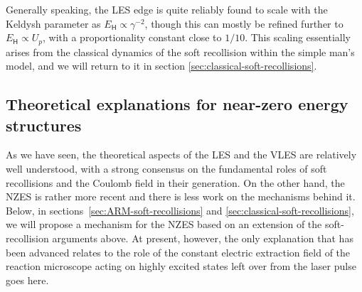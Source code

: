 Generally speaking, the LES edge is quite reliably found to scale with the Keldysh parameter as $E_\mathsf{H}\propto\gamma^{-2}$, though this can mostly be refined further to $E_\mathsf{H}\propto U_p$, with a proportionality constant close to $1/10$. This scaling essentially arises from the classical dynamics of the soft recollision within the simple man's model, and we will return to it in section \ref{sec:classical-soft-recollisions}.






%
%
%
%
%
%
%
%
%
%
%
%
%
%
%
%




\subsection{Theoretical explanations for near-zero energy structures}
\label{sec:NZES-theory}

As we have seen, the theoretical aspects of the LES and the VLES are relatively well understood, with a strong consensus on the fundamental roles of soft recollisions and the Coulomb field in their generation. On the other hand, the NZES is rather more recent and there is less work on the mechanisms behind it. Below, in sections~\ref{sec:ARM-soft-recollisions} and \ref{sec:classical-soft-recollisions}, we will propose a mechanism for the NZES based on an extension of the soft-recollision arguments above. At present, however, the only explanation that has been advanced relates to the role of the constant electric extraction field of the reaction microscope acting on highly excited states left over from the laser pulse~\cite{ZES_paper, Rost_latest} goes here.

